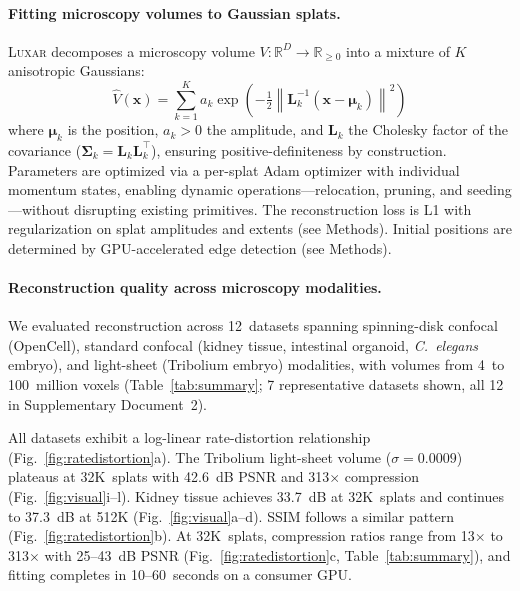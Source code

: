 \documentclass[10pt,twocolumn,letterpaper]{article}
\newcommand{\luxar}{\textsc{Luxar}\xspace}
\begin{document}
\paragraph{Fitting microscopy volumes to Gaussian splats.}
\luxar decomposes a microscopy volume $V: \mathbb{R}^D \to \mathbb{R}_{\geq 0}$ into a mixture of $K$ anisotropic Gaussians:
\begin{equation}
\hat{V}(\mathbf{x}) = \sum_{k=1}^{K} a_k \exp\!\left(-\tfrac{1}{2}\left\|\mathbf{L}_k^{-1}(\mathbf{x} - \boldsymbol{\mu}_k)\right\|^2\right)
\label{eq:gsplat}
\end{equation}
where $\boldsymbol{\mu}_k$ is the position, $a_k > 0$ the amplitude, and $\mathbf{L}_k$ the Cholesky factor of the covariance ($\boldsymbol{\Sigma}_k = \mathbf{L}_k \mathbf{L}_k^\top$), ensuring positive-definiteness by construction.
Parameters are optimized via a per-splat Adam optimizer\cite{kingma2015adam} with individual momentum states, enabling dynamic operations---relocation, pruning, and seeding---without disrupting existing primitives.
The reconstruction loss is L1 with regularization on splat amplitudes and extents (see Methods).
Initial positions are determined by GPU-accelerated edge detection (see Methods).

\paragraph{Reconstruction quality across microscopy modalities.}
We evaluated reconstruction across 12~datasets spanning spinning-disk confocal (OpenCell\cite{cho2022opencell}), standard confocal (kidney tissue, intestinal organoid, \emph{C.~elegans} embryo), and light-sheet (Tribolium embryo) modalities, with volumes from 4~to 100~million voxels (Table~\ref{tab:summary}; 7 representative datasets shown, all 12 in Supplementary Document~2).

All datasets exhibit a log-linear rate-distortion relationship (Fig.~\ref{fig:ratedistortion}a).
The Tribolium light-sheet volume ($\sigma = 0.0009$) plateaus at 32K~splats with 42.6~dB PSNR and 313$\times$ compression (Fig.~\ref{fig:visual}i--l).
Kidney tissue achieves 33.7~dB at 32K~splats and continues to 37.3~dB at 512K (Fig.~\ref{fig:visual}a--d).
SSIM follows a similar pattern (Fig.~\ref{fig:ratedistortion}b).
At 32K~splats, compression ratios range from 13$\times$ to 313$\times$ with 25--43~dB PSNR (Fig.~\ref{fig:ratedistortion}c, Table~\ref{tab:summary}), and fitting completes in 10--60~seconds on a consumer GPU.
\end{document}
